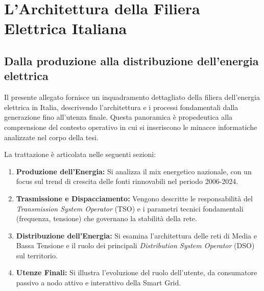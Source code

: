 \newpage
\blankpage
\chapter{L'Architettura della Filiera Elettrica Italiana}
\label{allegato:da-prod-alla-distrib}

\section{Dalla produzione alla distribuzione dell'energia elettrica}


Il presente allegato fornisce un inquadramento dettagliato della filiera dell'energia elettrica in Italia, descrivendo l'architettura e i processi fondamentali dalla generazione fino all'utenza finale. Questa panoramica è propedeutica alla comprensione del contesto operativo in cui si inseriscono le minacce informatiche analizzate nel corpo della tesi.


La trattazione è articolata nelle seguenti sezioni:

\begin{enumerate}
    \item \textbf{Produzione dell'Energia:} Si analizza il mix energetico nazionale, con un focus sul trend di crescita delle fonti rinnovabili nel periodo 2006-2024.
    \item \textbf{Trasmissione e Dispacciamento:} Vengono descritte le responsabilità del \textit{Transmission System Operator} (TSO) e i parametri tecnici fondamentali (frequenza, tensione) che governano la stabilità della rete.
    \item \textbf{Distribuzione dell'Energia:} Si esamina l'architettura delle reti di Media e Bassa Tensione e il ruolo dei principali \textit{Distribution System Operator} (DSO) sul territorio.
    \item \textbf{Utenze Finali:} Si illustra l'evoluzione del ruolo dell'utente, da consumatore passivo a nodo attivo e interattivo della Smart Grid.
\end{enumerate}

